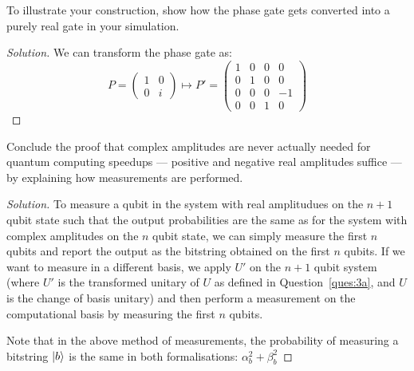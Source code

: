\begin{solution}[label=ques:3b]
  \begin{question}
    To illustrate your construction, show how the phase gate gets converted into a purely real gate in your simulation.
  \end{question}
  \tcblower{}
  \begin{proof}[Solution]
    We can transform the phase gate as:
    \begin{equation}
      P = \begin{pmatrix}
        1 & 0\\
        0 & i
        \end{pmatrix}
      \mapsto
      P' = \begin{pmatrix}
          1 & 0 & 0 & 0\\
          0 & 1 & 0 & 0\\
          0 & 0 & 0 & -1\\
          0 & 0 & 1 & 0
        \end{pmatrix}
      \label{eq:phasetoreal}
    \end{equation}
  \end{proof}
\end{solution}

\begin{solution}[label=ques:3c]
  \begin{question}
    Conclude the proof that complex amplitudes are never actually needed for quantum computing speedups --- positive and negative real amplitudes suffice --- by explaining how measurements are performed.
  \end{question}
  \tcblower{}
  \begin{proof}[Solution]
    To measure a qubit in the system with real amplitudues on the $n+1$ qubit state such that the output probabilities are the same as for the system with complex amplitudes on the $n$ qubit state, we can simply measure the first $n$ qubits and report the output as the bitstring obtained on the first $n$ qubits. If we want to measure in a different basis, we apply $U'$ on the $n+1$ qubit system (where $U'$ is the transformed unitary of $U$ as defined in Question~\ref{ques:3a}, and $U$ is the change of basis unitary) and then perform a measurement on the computational basis by measuring the first $n$ qubits.\par
    Note that in the above method of measurements, the probability of measuring a bitstring $\ket{b}$ is the same in both formalisations: $\alpha_b^2 + \beta_b^2$
  \end{proof}
\end{solution}
